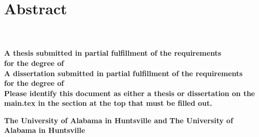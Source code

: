 
\chapter{Abstract}
     \begin{center}
        \large
        \singlespacing
        \textbf{\thesistitle}\\
        \vspace{0.5cm}
        \large
        \textbf{\studentname}\\
        \vspace{0.5cm}
        \normalsize
        \ifdefined\thesis
        \textbf{A thesis submitted in partial fulfillment of the requirements \\for the degree of \degree}\\  
        \else
        \ifdefined\dissertation
        \textbf{A dissertation submitted in partial fulfillment of the requirements \\for the degree of \degree}\\
        \else
        \textbf{Please identify this document as either a thesis or dissertation on the main.tex in the section at the top that must be filled out.}\\
    \fi
    \fi
        \vspace{1cm}
        \textbf{\department}
        
        \vspace{0.25cm}

        \ifdefined\jointuni
        \textbf{The University of Alabama in Huntsville and  \jointuni}
        \else
        \textbf{The University of Alabama in Huntsville}
    \fi

        
        \vspace{0.1cm}
        \textbf{\gradmonth\ \gradyear}
        


    \end{center}
\vspace{0.1cm}

\doublespacing

